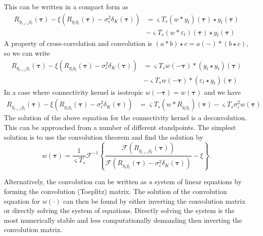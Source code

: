 \documentclass[]{article}
\begin{document}
This can be written in a compact form as
\begin{align}
	R_{y_{t+1}y_t}(\boldsymbol{\tau})-\xi \left(R_{y_ty_t}(\boldsymbol{\tau})-\sigma_{\epsilon}^2  \delta_{K}\left(\boldsymbol\tau\right)\right)& = \varsigma T_s(w\ast y_t)(\boldsymbol\tau)\star y_t(\boldsymbol\tau) \nonumber \\
&- \varsigma T_s(w\ast \varepsilon_t)(\boldsymbol\tau)\star y_t(\boldsymbol\tau)
\end{align}
A property of cross-correlation and convolution is $(a \ast b) \star c = a(-)\ast(b \star c)$, so we can write
\begin{align}
	R_{y_{t+1}y_t}(\boldsymbol{\tau}) -\xi \left(R_{y_ty_t}(\boldsymbol{\tau})-\sigma_{\epsilon}^2  \delta_{K}\left(\boldsymbol\tau\right)\right)& = \varsigma T_s w(-\boldsymbol\tau) \ast (y_t\star y_t)(\boldsymbol\tau)\nonumber\\
&-\varsigma T_s w(-\boldsymbol\tau) \ast (\varepsilon_t\star y_t)(\boldsymbol\tau)
\end{align}
In a case where connectivity kernel is isotropic $ w(-\boldsymbol\tau)= w(\boldsymbol\tau)$ and we have
\begin{align}
	R_{y_{t+1}y_t}(\boldsymbol{\tau}) -\xi \left(R_{y_ty_t}(\boldsymbol{\tau})-\sigma_{\epsilon}^2  \delta_{K}\left(\boldsymbol\tau\right)\right)& = \varsigma T_s (w\ast R_{y_ty_t})(\boldsymbol\tau)-\varsigma T_s \sigma^2_{\varepsilon}w(\boldsymbol\tau) 
\end{align}
The solution of the above equation for the connectivity kernel is a deconvolution. This can be approached from a number of different standpoints. The simplest solution is to use the convolution theorem and find the solution by 
\begin{equation}
	w(\boldsymbol{\tau}) = \frac{1}{\varsigma T_s}\mathcal{F}^{-1}\left\{\frac{\mathcal{F}\left(R_{y_{t+1}y_t}(\boldsymbol{\tau})\right)}{\mathcal{F}\left(R_{y_ty_t}(\boldsymbol{\tau})-\sigma^2_{\varepsilon}\delta_K(\boldsymbol\tau)\right)}-\xi\right\}.
\end{equation}

Alternatively, the convolution can be written as a system of linear equations by forming the convolution (Toeplitz) matrix. The solution of the convolution equation for $w(\cdot)$ can then be found by either inverting the convolution matrix or directly solving the system of equations. Directly solving the system is the most numerically stable and less computationally demanding then inverting the convolution matrix. 
\newpage
\end{document}
